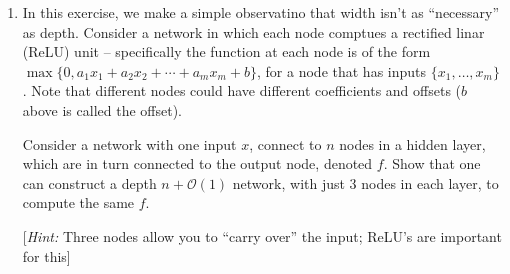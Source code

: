 \documentclass[12pt]{article}
\newcommand{\BigO}[1]{\mathcal{O}\left( #1 \right)}
\begin{document}
\begin{enumerate}
\begin{enumerate}
   {\bf Solution:}

\item What happens if you stack the network on top of itself? (Describe the function obtained). 

[Formally, this means the output of the network you constructed above is fed as the input to an identical network, and we are interested in the final output function.]

   {\bf Solution:}

In stacking the network ontop of itself, it creates two triangle functions, where the domain is split in half. This means that the ``trough'' between the two is at $x = 0.5$ with the peak of each being at $0.25$ and $0.75$ respectively. 

\item Prove that there is a ReLU network with one input variable $x$, $2k + \BigO{1}$ layers, all coefficients and thresholds being constants, that computes a function that has $2^{k}$ ``peaks'' in the interval $[0,1]$.

[The function above can be shown to be impossible to approximate using a small depth ReLU network, without an exponential blow-up in the width.]

   {\bf Solution:}

In order to do this, you simply need to stack the network ontop of itself, giving $2k$ layers, where $\BigO{1}$ comes from the input and output layers. Each layer of the network doubles the number of peaks.


\end{enumerate}

\newpage

\item In this exercise, we make a simple observatino that width isn't as ``necessary'' as depth. Consider a network in which each node comptues a rectified linar (ReLU) unit -- specifically the function at each node is of the form $\max \{0, a_{1}x_{1} + a_{2}x_{2} + \cdots + a_{m}x_{m} + b\}$, for a node that has inputs $\{ x_{1}, \ldots, x_{m}\}$. Note that different nodes could have different coefficients and offsets ($b$ above is called the offset).

Consider a network with one input $x$, connect to $n$ nodes in a hidden layer, which are in turn connected to the output node, denoted $f$. Show that one can construct a depth $n + \BigO{1}$ network, with just 3 nodes in each layer, to compute the same $f$.

[{\em Hint:} Three nodes allow you to ``carry over'' the input; ReLU's are important for this]


\end{enumerate}
\end{document}
